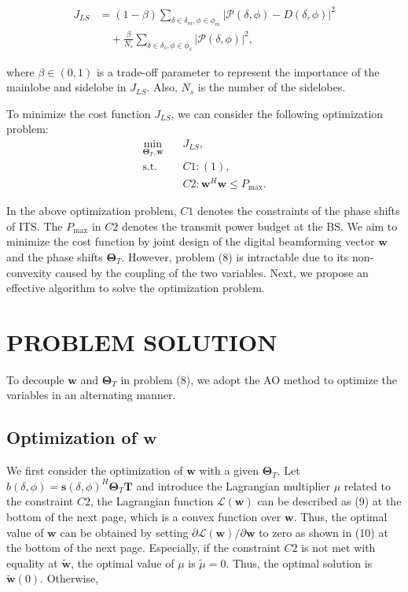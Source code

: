 \documentclass[journal,comsoc]{IEEEtran}
\begin{document}
	\[
	\begin{split}
		J_{LS} &= (1 - \beta) \sum_{\delta \in \delta_m, \phi \in \phi_m} \left| \mathcal{P}(\delta, \phi) - D(\delta, \phi) \right|^2 \\
		& \quad + \frac{\beta}{N_s} \sum_{\delta \in \delta_s, \phi \in \phi_s} \left| \mathcal{P}(\delta, \phi) \right|^2,
	\end{split}
	\tag{7}
	\]
	
	
	where $ \beta \in (0,1) $ is a trade-off parameter to represent the importance of the mainlobe and sidelobe in $ J_{LS} $. Also, $ N_s $ is the number of the sidelobes.
	
	To minimize the cost function $ J_{LS} $, we can consider the following optimization problem:
\begin{align}  %
	\min_{\boldsymbol{\Theta}_T, \boldsymbol{w}} &\quad J_{LS}, \tag{8a} \\
	\text{s.t.} &\quad C1: (1), \tag{8b} \\  
	&\quad C2: \boldsymbol{w}^H \boldsymbol{w} \leq P_{\text{max}}. \tag{8c}
\end{align}
	
	In the above optimization problem, $ C1 $ denotes the constraints of the phase shifts of ITS. The $ P_{\text{max}} $ in $ C2 $ denotes the transmit power budget at the BS. We aim to minimize the cost function by joint design of the digital beamforming vector $ \boldsymbol{w} $ and the phase shifts $ \boldsymbol{\Theta}_T $. However, problem (8) is intractable due to its non-convexity caused by the coupling of the two variables. Next, we propose an effective algorithm to solve the optimization problem.
	
	\section{PROBLEM SOLUTION}
	
	To decouple $ \boldsymbol{w} $ and $ \boldsymbol{\Theta}_T $ in problem (8), we adopt the AO method to optimize the variables in an alternating manner.
	
	\subsection{Optimization of $\boldsymbol{w} $}
	
	We first consider the optimization of $ \boldsymbol{w} $ with a given $ \boldsymbol{\Theta}_T $. Let $ b(\delta, \phi) = \boldsymbol{s}(\delta, \phi)^H \boldsymbol{\Theta}_T \mathbf{T} $ and introduce the Lagrangian multiplier $ \mu $ related to the constraint $ C2 $, the Lagrangian function $ \mathcal{L}(\boldsymbol{w}) $ can be described as (9) at the bottom of the next page, which is a convex function over $ \boldsymbol{w} $. Thus, the optimal value of $ \boldsymbol{w} $ can be obtained by setting $ \partial \mathcal{L}(\boldsymbol{w}) / \partial \boldsymbol{w} $ to zero as shown in (10) at the bottom of the next page. Especially, if the constraint $ C2 $ is not met with equality at $ \tilde{\boldsymbol{w}} $, the optimal value of $ \mu $ is $ \tilde{\mu} = 0 $. Thus, the optimal solution is $ \tilde{\boldsymbol{w}}(0) $. Otherwise,
	
\end{document}

